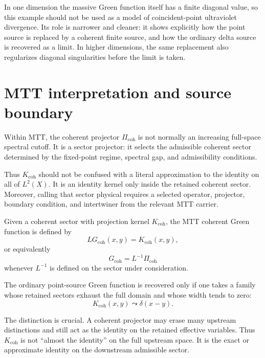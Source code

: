 \documentclass[11pt]{article}
\begin{document}
In one dimension the massive Green function itself has a finite diagonal value, so this example should not be used as a model of coincident-point ultraviolet divergence. Its role is narrower and cleaner: it shows explicitly how the point source is replaced by a coherent finite source, and how the ordinary delta source is recovered as a limit. In higher dimensions, the same replacement also regularizes diagonal singularities before the limit is taken.

\section{MTT interpretation and source boundary}

Within MTT, the coherent projector \(\Pi_{\mathrm{coh}}\) is not normally an increasing full-space spectral cutoff. It is a sector projector: it selects the admissible coherent sector determined by the fixed-point regime, spectral gap, and admissibility conditions.

Thus \(K_{\mathrm{coh}}\) should not be confused with a literal approximation to the identity on all of \(L^2(X)\). It is an identity kernel only inside the retained coherent sector.  Moreover, calling that sector physical requires a selected operator, projector, boundary condition, and intertwiner from the relevant MTT carrier.

\begin{definition}
Given a coherent sector with projection kernel \(K_{\mathrm{coh}}\), the MTT coherent Green function is defined by
\begin{equation}
LG_{\mathrm{coh}}(x,y)=K_{\mathrm{coh}}(x,y),
\end{equation}
or equivalently
\begin{equation}
G_{\mathrm{coh}}=L^{-1}\Pi_{\mathrm{coh}}
\end{equation}
whenever \(L^{-1}\) is defined on the sector under consideration.
\end{definition}

The ordinary point-source Green function is recovered only if one takes a
family whose retained sectors exhaust the full domain and whose width tends
to zero:
\[
K_{\mathrm{coh}}(x,y)\leadsto \delta(x-y).
\]

\begin{remark}
The distinction is crucial. A coherent projector may erase many upstream distinctions and still act as the identity on the retained effective variables. Thus \(K_{\mathrm{coh}}\) is not ``almost the identity'' on the full upstream space. It is the exact or approximate identity on the downstream admissible sector.
\end{remark}
\end{document}
